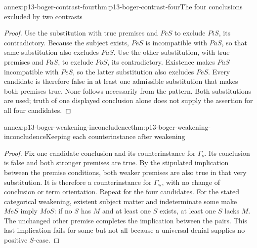 \begin{annexitem}{annex:p13-boger-contrast-four}{thm:p13-boger-contrast-four}{The four conclusions excluded by two contrasts}
\begin{proof}
Use the substitution with true premises and \(PeS\) to exclude \(PiS\),
its contradictory. Because the subject exists, \(PeS\) is incompatible
with \(PaS\), so that same substitution also excludes \(PaS\).
Use the other substitution, with true premises and \(PaS\), to exclude
\(PoS\), its contradictory. Existence makes \(PaS\) incompatible with
\(PeS\), so the latter substitution also excludes \(PeS\).
Every candidate is therefore false in at least one admissible substitution
that makes both premises true. None follows necessarily from the pattern.
Both substitutions are used; truth of one displayed conclusion alone
does not supply the assertion for all four candidates.
\end{proof}
\end{annexitem}

\begin{annexitem}{annex:p13-boger-weakening-inconcludence}{thm:p13-boger-weakening-inconcludence}{Keeping each counterinstance after weakening}
\begin{proof}
Fix one candidate conclusion and its counterinstance for
\(\Gamma_{\mathrm{s}}\). Its conclusion is false and both stronger premises
are true. By the stipulated implication between the premise conditions,
both weaker premises are also true in that very substitution. It is
therefore a counterinstance for \(\Gamma_{\mathrm{w}}\), with no change
of conclusion or term orientation. Repeat for the four candidates.
For the stated categorical weakening, existent subject matter and
indeterminate some make \(MeS\) imply \(MoS\): if no \(S\) has \(M\)
and at least one \(S\) exists, at least one \(S\) lacks \(M\).
The unchanged other premise completes the implication between the pairs.
This last implication fails for some-but-not-all because a universal
denial supplies no positive \(S\)-case.
\end{proof}
\end{annexitem}

